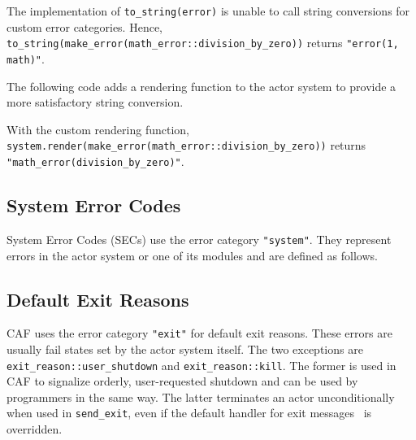 
The implementation of \lstinline^to_string(error)^ is unable to call string
conversions for custom error categories. Hence,
\lstinline^to_string(make_error(math_error::division_by_zero))^ returns
\lstinline^"error(1, math)"^.

The following code adds a rendering function to the actor system to provide a
more satisfactory string conversion.


With the custom rendering function,
\lstinline^system.render(make_error(math_error::division_by_zero))^ returns
\lstinline^"math_error(division_by_zero)"^.

\clearpage
\subsection{System Error Codes}
\label{sec}

System Error Codes (SECs) use the error category \lstinline^"system"^. They
represent errors in the actor system or one of its modules and are defined as
follows.


\subsection{Default Exit Reasons}
\label{exit-reason}

CAF uses the error category \lstinline^"exit"^ for default exit reasons. These
errors are usually fail states set by the actor system itself. The two
exceptions are \lstinline^exit_reason::user_shutdown^ and
\lstinline^exit_reason::kill^. The former is used in CAF to signalize orderly,
user-requested shutdown and can be used by programmers in the same way. The
latter terminates an actor unconditionally when used in \lstinline^send_exit^,
even if the default handler for exit messages~ is overridden.


